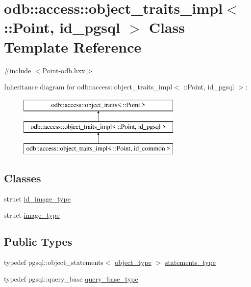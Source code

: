 \hypertarget{classodb_1_1access_1_1object__traits__impl_3_01_1_1_point_00_01id__pgsql_01_4}{}\section{odb\+:\+:access\+:\+:object\+\_\+traits\+\_\+impl$<$ \+:\+:Point, id\+\_\+pgsql $>$ Class Template Reference}
\label{classodb_1_1access_1_1object__traits__impl_3_01_1_1_point_00_01id__pgsql_01_4}


{\ttfamily \#include $<$Point-\/odb.\+hxx$>$}

Inheritance diagram for odb\+:\+:access\+:\+:object\+\_\+traits\+\_\+impl$<$ \+:\+:Point, id\+\_\+pgsql $>$\+:\begin{figure}[H]
\begin{center}
\leavevmode
\includegraphics[height=3.000000cm]{da/d2d/classodb_1_1access_1_1object__traits__impl_3_01_1_1_point_00_01id__pgsql_01_4}
\end{center}
\end{figure}
\subsection*{Classes}
\begin{DoxyCompactItemize}
\item 
struct \hyperlink{structodb_1_1access_1_1object__traits__impl_3_01_1_1_point_00_01id__pgsql_01_4_1_1id__image__type}{id\+\_\+image\+\_\+type}
\item 
struct \hyperlink{structodb_1_1access_1_1object__traits__impl_3_01_1_1_point_00_01id__pgsql_01_4_1_1image__type}{image\+\_\+type}
\end{DoxyCompactItemize}
\subsection*{Public Types}
\begin{DoxyCompactItemize}
\item 
typedef pgsql\+::object\+\_\+statements$<$ \hyperlink{classodb_1_1access_1_1object__traits_3_01_1_1_point_01_4_ae04031244a1864e5bcd0585ec7b4a59b}{object\+\_\+type} $>$ \hyperlink{classodb_1_1access_1_1object__traits__impl_3_01_1_1_point_00_01id__pgsql_01_4_a41c7a102d251fa1e0931ff84448cf466}{statements\+\_\+type}
\item 
typedef pgsql\+::query\+\_\+base \hyperlink{classodb_1_1access_1_1object__traits__impl_3_01_1_1_point_00_01id__pgsql_01_4_a37783d97a2a77476482f2da2298d39ce}{query\+\_\+base\+\_\+type}
\end{DoxyCompactItemize}
